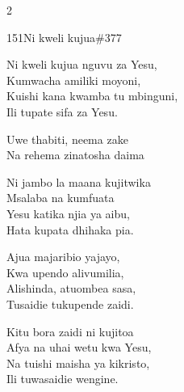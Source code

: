 \documentclass{article}
\begin{document}
\begin{multicols}{2}
\begin{hymn}{151}{Ni kweli kujua}{\#377}
\begin{stanza}
Ni kweli kujua nguvu za Yesu,\\
Kumwacha amiliki moyoni,\\
Kuishi kana kwamba tu mbinguni,\\
Ili tupate sifa za Yesu.
\end{stanza}
\begin{chorus}
Uwe thabiti, neema zake\\
Na rehema zinatosha daima
\end{chorus}
\begin{stanza}
Ni jambo la maana kujitwika\\
Msalaba na kumfuata\\
Yesu katika njia ya aibu,\\
Hata kupata dhihaka pia.
\end{stanza}
\begin{stanza}
Ajua majaribio yajayo,\\
Kwa upendo alivumilia,\\
Alishinda, atuombea sasa,\\
Tusaidie tukupende zaidi.
\end{stanza}
\begin{stanza}
Kitu bora zaidi ni kujitoa\\
Afya na uhai wetu kwa Yesu,\\
Na tuishi maisha ya kikristo,\\
Ili tuwasaidie wengine.
\end{stanza}
\end{hymn}


\end{multicols}
\end{document}
